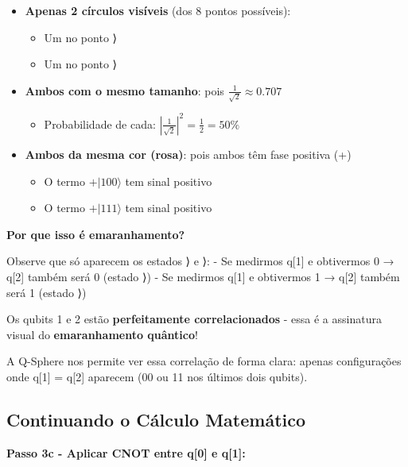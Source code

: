\documentclass[
  brazilian,
]{report}
\providecommand{\tightlist}{%
  \setlength{\itemsep}{0pt}\setlength{\parskip}{0pt}}
\begin{document}
\begin{itemize}
\tightlist
\item
  \textbf{Apenas 2 círculos visíveis} (dos 8 pontos possíveis):

  \begin{itemize}
  \tightlist
  \item
    Um no ponto ⟩
  \item
    Um no ponto ⟩
  \end{itemize}
\item
  \textbf{Ambos com o mesmo tamanho}: pois
  \(\frac{1}{\sqrt{2}} \approx 0.707\)

  \begin{itemize}
  \tightlist
  \item
    Probabilidade de cada:
    \(\left|\frac{1}{\sqrt{2}}\right|^2 = \frac{1}{2} = 50\%\)
  \end{itemize}
\item
  \textbf{Ambos da mesma cor (rosa)}: pois ambos têm fase positiva (+)

  \begin{itemize}
  \tightlist
  \item
    O termo \(+|100\rangle\) tem sinal positivo
  \item
    O termo \(+|111\rangle\) tem sinal positivo
  \end{itemize}
\end{itemize}

\textbf{Por que isso é emaranhamento?}

Observe que só aparecem os estados ⟩ e ⟩: - Se
medirmos q{[}1{]} e obtivermos 0 → q{[}2{]} também será 0 (estado
⟩) - Se medirmos q{[}1{]} e obtivermos 1 → q{[}2{]} também
será 1 (estado ⟩)

Os qubits 1 e 2 estão \textbf{perfeitamente correlacionados} - essa é a
assinatura visual do \textbf{emaranhamento quântico}! 🔗✨

A Q-Sphere nos permite ver essa correlação de forma clara: apenas
configurações onde q{[}1{]} = q{[}2{]} aparecem (00 ou 11 nos últimos
dois qubits).

\subsection{Continuando o Cálculo
Matemático}\label{continuando-o-cuxe1lculo-matemuxe1tico}

\textbf{Passo 3c - Aplicar CNOT entre q{[}0{]} e q{[}1{]}:}
\end{document}
